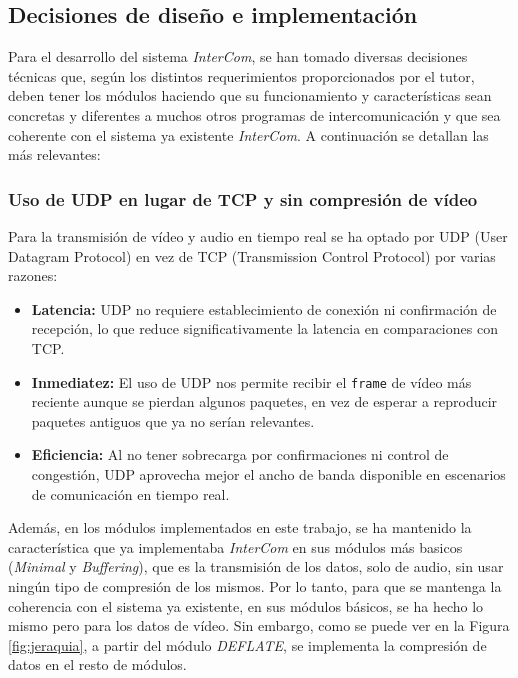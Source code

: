 \newpage

\subsection{Decisiones de diseño e implementación}

Para el desarrollo del sistema \textit{InterCom}, se han tomado diversas decisiones técnicas que, según los distintos requerimientos proporcionados por el tutor, deben tener los módulos haciendo que su funcionamiento y características sean concretas y diferentes a muchos otros programas de intercomunicación y que sea coherente con el sistema ya existente \textit{InterCom}. A continuación se detallan las más relevantes:

\subsubsection{Uso de UDP en lugar de TCP y sin compresión de vídeo}

Para la transmisión de vídeo y audio en tiempo real se ha optado por UDP (User Datagram Protocol) en vez de TCP (Transmission Control Protocol) por varias razones:

\begin{itemize} 
    \item \textbf{Latencia:} UDP no requiere establecimiento de conexión ni confirmación de recepción, lo que reduce significativamente la latencia en comparaciones con TCP. \cite{lpi}
    \item \textbf{Inmediatez:} El uso de UDP nos permite recibir el \texttt{frame} de vídeo más reciente aunque se pierdan algunos paquetes, en vez de esperar a reproducir paquetes antiguos que ya no serían relevantes. \cite{rfc768}
    \item \textbf{Eficiencia:} Al no tener sobrecarga por confirmaciones ni control de congestión, UDP aprovecha mejor el ancho de banda disponible en escenarios de comunicación en tiempo real. \cite{cloudflare_udp}
\end{itemize}

Además, en los módulos implementados en este trabajo, se ha mantenido la característica que ya implementaba \textit{InterCom} en sus módulos más basicos (\textit{Minimal} y \textit{Buffering}), que es la transmisión de los datos, solo de audio, sin usar ningún tipo de compresión de los mismos. Por lo tanto, para que se mantenga la coherencia con el sistema ya existente, en sus módulos básicos, se ha hecho lo mismo pero para los datos de vídeo. Sin embargo, como se puede ver en la Figura \ref{fig:jeraquia}, a partir del módulo \textit{DEFLATE}, se implementa la compresión de datos en el resto de módulos.

